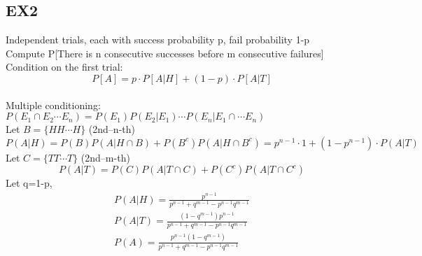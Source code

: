\subsection*{EX2}
Independent trials, each with success probability p, fail probability 1-p
\\Compute P[There is n consecutive successes before m consecutive failures]
Condition on the first trial: $$
    P[A]=p\cdot P[A|H]+(1-p)\cdot P[A|T]
$$ 
\\Multiple conditioning: $ P(E_1\cap E_2\cdots E_n)=P(E_1)P(E_2|E_1)\cdots P(E_n|E_1\cap\cdots E_n) $ \\
Let $ B=\{HH\cdots H\} $ (2nd--n-th) $$ P(A|H)=P(B)P(A|H\cap B)+P(B^c)P(A|H\cap B^c)=p^{n-1}\cdot 1+(1-p^{n-1})\cdot P(A|T) $$ 
Let $ C=\{TT\cdots T\} $ (2nd--m-th) $$ P(A|T)=P(C)P(A|T\cap C)+P(C^c)P(A|T\cap C^c)$$
Let q=1-p,\begin{align*}{}{}
P(A|H)=\frac{p^{n-1}}{p^{n-1}+q^{m-1}-p^{n-1}q^{m-1}}\\
P(A|T)=\frac{(1-q^{m-1})p^{n-1}}{p^{n-1}+q^{m-1}-p^{n-1}q^{m-1}}\\
P(A)=\frac{p^{n-1}(1-q^{m-1})}{p^{n-1}+q^{m-1}-p^{n-1}q^{m-1}}
\end{align*}
